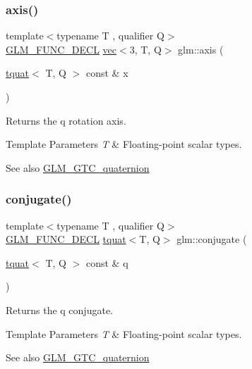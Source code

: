 \subsubsection{\texorpdfstring{axis()}{axis()}}
{\footnotesize\ttfamily template$<$typename T , qualifier Q$>$ \\
\hyperlink{setup_8hpp_ab2d052de21a70539923e9bcbf6e83a51}{G\+L\+M\+\_\+\+F\+U\+N\+C\+\_\+\+D\+E\+CL} \hyperlink{structglm_1_1vec}{vec}$<$3, T, Q$>$ glm\+::axis (\begin{DoxyParamCaption}\item[{\hyperlink{structglm_1_1tquat}{tquat}$<$ T, Q $>$ const \&}]{x }\end{DoxyParamCaption})}

Returns the q rotation axis.


\begin{DoxyTemplParams}{Template Parameters}
{\em T} & Floating-\/point scalar types.\\
\hline
\end{DoxyTemplParams}
\begin{DoxySeeAlso}{See also}
\hyperlink{group__gtc__quaternion}{G\+L\+M\+\_\+\+G\+T\+C\+\_\+quaternion} 
\end{DoxySeeAlso}
\mbox{\label{group__gtc__quaternion_gac40833db608deda477f018767b9a1cad}} 
\subsubsection{\texorpdfstring{conjugate()}{conjugate()}}
{\footnotesize\ttfamily template$<$typename T , qualifier Q$>$ \\
\hyperlink{setup_8hpp_ab2d052de21a70539923e9bcbf6e83a51}{G\+L\+M\+\_\+\+F\+U\+N\+C\+\_\+\+D\+E\+CL} \hyperlink{structglm_1_1tquat}{tquat}$<$T, Q$>$ glm\+::conjugate (\begin{DoxyParamCaption}\item[{\hyperlink{structglm_1_1tquat}{tquat}$<$ T, Q $>$ const \&}]{q }\end{DoxyParamCaption})}

Returns the q conjugate.


\begin{DoxyTemplParams}{Template Parameters}
{\em T} & Floating-\/point scalar types.\\
\hline
\end{DoxyTemplParams}
\begin{DoxySeeAlso}{See also}
\hyperlink{group__gtc__quaternion}{G\+L\+M\+\_\+\+G\+T\+C\+\_\+quaternion} 
\end{DoxySeeAlso}
\mbox{\label{group__gtc__quaternion_gab219911644fdc694e7d275cfcf35bfca}} 
